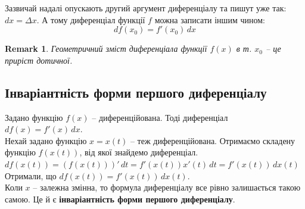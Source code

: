 \documentclass[a4paper, 14pt]{article}
\theoremstyle{theoremdd}
\theoremstyle{theoremdd}
\theoremstyle{theoremdd}
\theoremstyle{theoremdd}
\theoremstyle{theoremdd}
\theoremstyle{theoremdd}
\newtheorem{remark}[theorem]{Remark}
\theoremstyle{theoremdd}
\theoremstyle{theoremdd}
\begin{document}
Зазвичай надалі опускають другий аргумент диференціалу та пишут уже так: $dx = \Delta x$. А тому диференціал функції $f$ можна записати іншим чином:
$$ df(x_0) = f'(x_0)\,dx $$

\begin{remark}
Геометричний зміст диференціала функції $f(x)$ в т. $x_0$ -- це приріст дотичної.
\\ %
\end{remark}

\subsection{Інваріантність форми першого диференціалу}
Задано функцію $f(x)$ -- диференційована. Тоді диференціал $df(x) = f'(x)\,dx$.\\
Нехай задано функцію $x = x(t)$ -- теж диференційована. Отримаємо складену функцію $f(x(t))$, від якої знайдемо диференціал.\\
$df(x(t)) = (f(x(t)))'\,dt = f'(x(t))x'(t)\,dt = f'(x(t))\,dx(t)$\\
Отримали, що $df(x(t)) = f'(x(t))\,dx(t)$.\\
Коли $x$ -- залежна змінна, то формула диференціалу все рівно залишається такою самою. Це й є \textbf{інваріантність форми першого диференціалу}.
\end{document}
